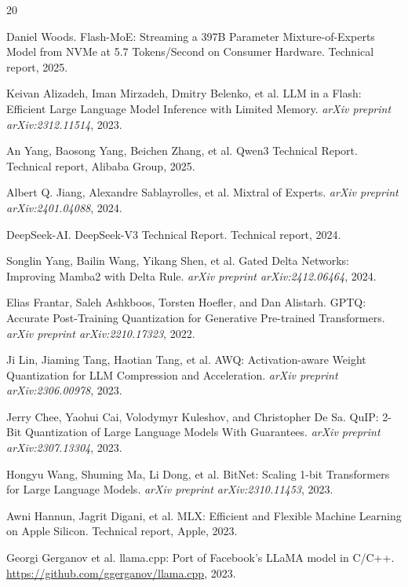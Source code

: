 \documentclass[11pt,twocolumn]{article}
\begin{document}

\begin{thebibliography}{20}

Daniel Woods.
\newblock Flash-MoE: Streaming a 397B Parameter Mixture-of-Experts Model from NVMe at 5.7 Tokens/Second on Consumer Hardware.
\newblock Technical report, 2025.

Keivan Alizadeh, Iman Mirzadeh, Dmitry Belenko, et al.
\newblock LLM in a Flash: Efficient Large Language Model Inference with Limited Memory.
\newblock \emph{arXiv preprint arXiv:2312.11514}, 2023.

An Yang, Baosong Yang, Beichen Zhang, et al.
\newblock Qwen3 Technical Report.
\newblock Technical report, Alibaba Group, 2025.

Albert Q. Jiang, Alexandre Sablayrolles, et al.
\newblock Mixtral of Experts.
\newblock \emph{arXiv preprint arXiv:2401.04088}, 2024.

DeepSeek-AI.
\newblock DeepSeek-V3 Technical Report.
\newblock Technical report, 2024.

Songlin Yang, Bailin Wang, Yikang Shen, et al.
\newblock Gated Delta Networks: Improving Mamba2 with Delta Rule.
\newblock \emph{arXiv preprint arXiv:2412.06464}, 2024.

Elias Frantar, Saleh Ashkboos, Torsten Hoefler, and Dan Alistarh.
\newblock GPTQ: Accurate Post-Training Quantization for Generative Pre-trained Transformers.
\newblock \emph{arXiv preprint arXiv:2210.17323}, 2022.

Ji Lin, Jiaming Tang, Haotian Tang, et al.
\newblock AWQ: Activation-aware Weight Quantization for LLM Compression and Acceleration.
\newblock \emph{arXiv preprint arXiv:2306.00978}, 2023.

Jerry Chee, Yaohui Cai, Volodymyr Kuleshov, and Christopher De Sa.
\newblock QuIP: 2-Bit Quantization of Large Language Models With Guarantees.
\newblock \emph{arXiv preprint arXiv:2307.13304}, 2023.

Hongyu Wang, Shuming Ma, Li Dong, et al.
\newblock BitNet: Scaling 1-bit Transformers for Large Language Models.
\newblock \emph{arXiv preprint arXiv:2310.11453}, 2023.

Awni Hannun, Jagrit Digani, et al.
\newblock MLX: Efficient and Flexible Machine Learning on Apple Silicon.
\newblock Technical report, Apple, 2023.

Georgi Gerganov et al.
\newblock llama.cpp: Port of Facebook's LLaMA model in C/C++.
\newblock \url{https://github.com/ggerganov/llama.cpp}, 2023.


\end{thebibliography}
\end{document}
